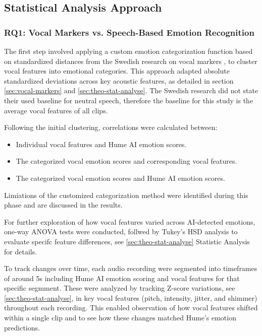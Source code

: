\subsection{Statistical Analysis Approach}
\subsubsection{RQ1: Vocal Markers vs. Speech-Based Emotion Recognition}
The first step involved applying a custom emotion categorization function based on standardized distances from the Swedish research on vocal markers \autocite{Ekberg2023}, to cluster vocal features into emotional categories. This approach adapted 
absolute standardized deviations across key acoustic features, as detailed in section \ref{sec:vocal-markers} and \ref{sec:theo-stat-analyse}. The Swedish research did not state their used baseline for neutral speech, therefore the baseline for this study is the average vocal features of all clips. 

Following the initial clustering, correlations were calculated between: 
\begin{itemize}
    \item Individual vocal features and Hume AI emotion scores. 
    \item The categorized vocal emotion scores and corresponding vocal features. 
    \item The categorized vocal emotion scores and Hume AI emotion scores.
\end{itemize}
Limiations of the customized categorization method were identified during this phase and are discussed in the results. 

For further exploration of how vocal features varied across AI-detected emotions, one-way ANOVA tests were conducted, follwed by Tukey's HSD analysis to evaluate specifc feature differences, see \ref{sec:theo-stat-analyse} Statistic Analysis for details.  

To track changes over time, each audio recording were segmented into timeframes of around 5s including Hume AI emotion scoring and vocal features for that specific segmment. These were analyzed by tracking Z-score variations, see \ref{sec:theo-stat-analyse}, in key vocal features (pitch, intensity, jitter, and shimmer) throughout each recording. 
This enabled observation of how vocal features shifted within a single clip and to see how these changes matched Hume's emotion predictions. 

